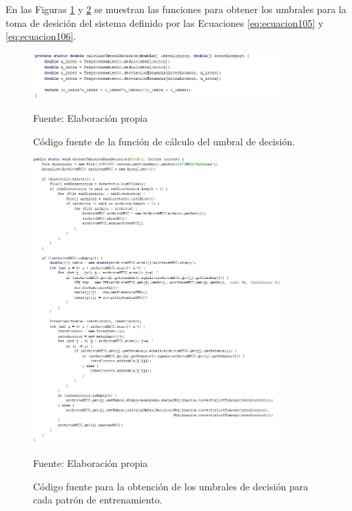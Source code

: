 En las Figuras \ref{fig:figura3.88} y \ref{fig:figura3.89} se muestran las funciones para obtener los umbrales para la toma de desición del sistema definido por las Ecuaciones \eqref{eq:ecuacion105} y \eqref{eq:ecuacion106}.
\begin{figure}[H]
\captionsetup{justification=centering}
\begin{center}
\includegraphics[width=0.85\textwidth]{Imagenes/Cap3/image088}
\end{center}
\begin{center}
\vskip -0.5cm
\caption{\small{Código fuente de la función de cálculo del umbral de decisión.}}
\label{fig:figura3.88}
{\small{Fuente: Elaboración propia}}
\end{center}
\end{figure}

\begin{figure}[H]
\captionsetup{justification=centering}
\begin{center}
\includegraphics[width=0.85\textwidth]{Imagenes/Cap3/image089}
\end{center}
\begin{center}
\vskip -0.5cm
\caption{\small{Código fuente para la obtención de los umbrales de decisión para cada patrón de entrenamiento.}}
\label{fig:figura3.89}
{\small{Fuente: Elaboración propia}}
\end{center}
\end{figure}
